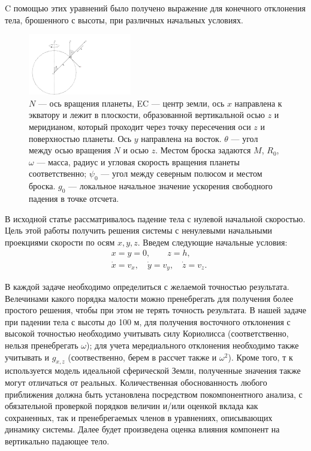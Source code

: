 \documentclass[hoptionsi, twocolumn]{revtex4-2}
\begin{document}
 C помощью этих уравнений было получено выражение для конечного отклонения тела, брошенного с высоты, при различных начальных условиях.\\
\begin{figure}[h]
\centering
\includegraphics[width=0.4\textwidth]{pick-1}
\caption{$N$ --- ось вращения планеты, EC --- центр земли, ось $x$ направлена к экватору и  лежит в плоскости, образованной вертикальной осью $z$ и меридианом, который проходит через точку пересечения оси $z$ и поверхностью планеты. Ось $y$ направлена на восток. $\theta$ --- угол между осью вращения $N$ и осью $z$. Местом броска задаются $M$, $R_0$, $\omega$ --- масса, радиус и  угловая скорость вращения планеты соответственно; $\psi_0$ --- угол между северным полюсом и местом броска. $g_0$ --- локальное начальное значение ускорения свободного падения в точке отсчета.}
\label{fig:pick-1}
\end{figure}
В исходной статье рассматривалось падение тела с нулевой начальной скоростью. Цель этой работы получить решения системы с ненулевыми начальными проекциями скорости по осям $x, y, z$. Введем следующие начальные условия:
\begin{equation*}
    \begin{aligned}
        &x =y=0, \qquad z=h,\\
        &\dot x=v_x, \quad \dot y=v_y, \quad \dot z =v_z.
    \end{aligned}
\end{equation*}



В каждой задаче необходимо определиться с желаемой точностью результата. Велечинами какого порядка малости можно пренебрегать для получения более простого решения, чтобы при этом не терять точность результата. В нашей задаче при падении тела с высоты до 100 м, для получения восточного отклонения с высокой точностью необходимо учитывать силу Кориолисса (соответственно, нельзя пренебрегать $\omega$); для учета мередиального отклонения необходимо также учитывать и $g_{x,z}$ (соотвественно, берем в рассчет также и $\omega^2$). Кроме того, т к используется модель идеальной сферической Земли, полученные значения также могут отличаться от реальных.
Количественная обоснованность любого
приближения должна быть установлена посредством покомпонентного анализа, с обязательной проверкой порядков величин и/или
оценкой вклада как сохраненных, так и пренебрегаемых членов в уравнениях, описывающих динамику системы. Далее будет произведена оценка влияния компонент на вертикально падающее тело.
\end{document}
